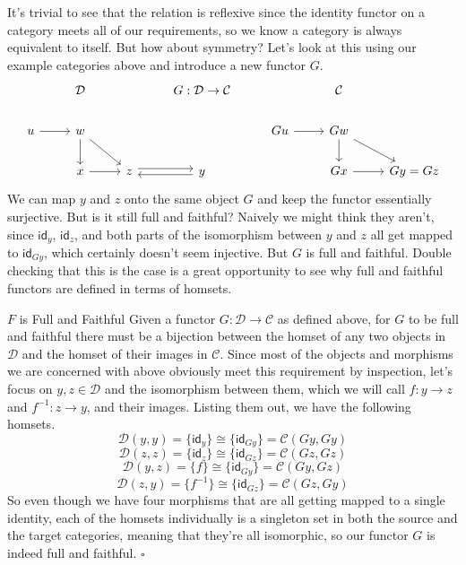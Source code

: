 \documentclass[12pt]{article}
\newcounter{examp}
\begin{document}
It's trivial to see that the relation is reflexive since the identity functor on a category meets all of our requirements, so we know a category is always equivalent to itself.
But how about symmetry?
Let's look at this using our example categories above and introduce a new functor $G$.
\[\begin{tikzcd}
        & {\mathcal{D}} && {G:\mathcal{D}\rightarrow\mathcal{C}} && {\mathcal{C}} \\
        u & w &&& Gu & Gw \\
        & x & z & y && Gx & {Gy=Gz}
        \arrow[from=2-1, to=2-2]
        \arrow[from=2-2, to=3-2]
        \arrow[from=3-2, to=3-3]
        \arrow[from=2-2, to=3-3]
        \arrow[from=2-5, to=2-6]
        \arrow[from=2-6, to=3-6]
        \arrow[from=2-6, to=3-7]
        \arrow[from=3-6, to=3-7]
        \arrow[shift left, from=3-3, to=3-4]
        \arrow[shift left, from=3-4, to=3-3]
    \end{tikzcd}\]
We can map $y$ and $z$ onto the same object $G$ and keep the functor essentially surjective.
But is it still full and faithful?
Naively we might think they aren't, since $\mathsf{id}_y$, $\mathsf{id}_z$, and both parts of the isomorphism between $y$ and $z$ all get mapped to $\mathsf{id}_{Gy}$, which certainly doesn't seem injective.
But $G$ is full and faithful.
Double checking that this is the case is a great opportunity to see why full and faithful functors are defined in terms of homsets.
\begin{proofbox}{$F$ is Full and Faithful}{}
    Given a functor $G: \mathcal{D} \rightarrow \mathcal{C}$ as defined above, for $G$ to be full and faithful there must be a bijection between the homset of any two objects in $\mathcal{D}$ and the homset of their images in $\mathcal{C}$.
    Since most of the objects and morphisms we are concerned with above obviously meet this requirement by inspection, let's focus on $y,z \in \mathcal{D}$ and the isomorphism between them, which we will call $f:y\rightarrow z$ and $f^{-1}:z\rightarrow y$, and their images.
    Listing them out, we have the following homsets.
    $$\mathcal{D}(y, y) = \{\mathsf{id}_y\} \cong \{\mathsf{id}_{Gy}\} = \mathcal{C}(Gy, Gy)$$
    $$\mathcal{D}(z, z) = \{\mathsf{id}_z\} \cong \{\mathsf{id}_{Gz}\} = \mathcal{C}(Gz, Gz)$$
    $$\mathcal{D}(y, z) = \{f\} \cong \{\mathsf{id}_{Gy}\} = \mathcal{C}(Gy, Gz)$$
    $$\mathcal{D}(z, y) = \{f^{-1}\} \cong \{\mathsf{id}_{Gz}\} = \mathcal{C}(Gz, Gy)$$
    So even though we have four morphisms that are all getting mapped to a single identity, each of the homsets individually is a singleton set in both the source and the target categories, meaning that they're all isomorphic, so our functor $G$ is indeed full and faithful. $\square$
\end{proofbox}
\end{document}
